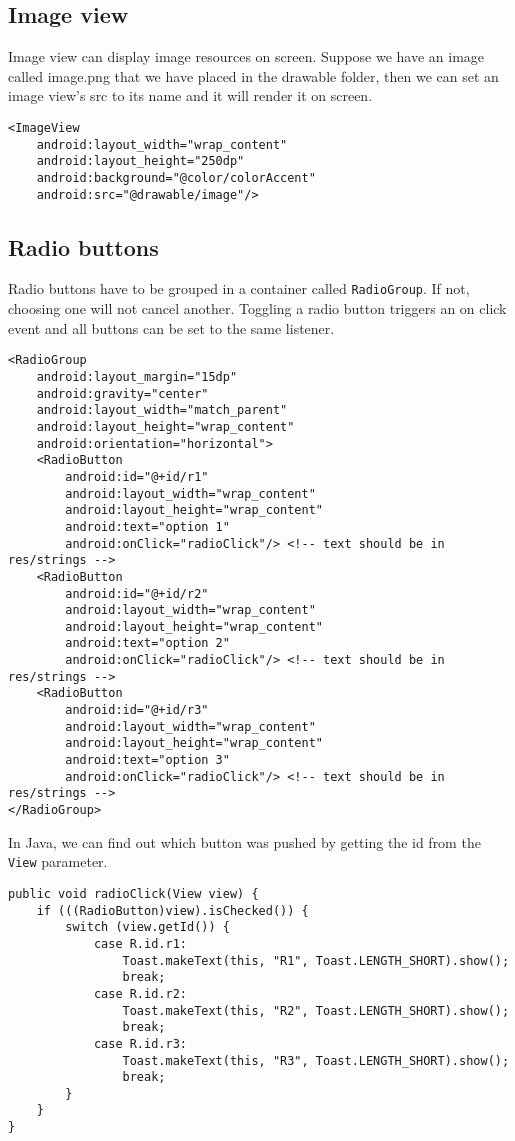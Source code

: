 \subsection{Image view}
Image view can display image resources on screen. Suppose we have an image called image.png that we have placed in the drawable folder, then we can set an image view's src to its name and it will render it on screen.
\begin{lstlisting}[style=A_XML, caption={Image view declaration}, label={listing:img}]
<ImageView
    android:layout_width="wrap_content"
    android:layout_height="250dp"
    android:background="@color/colorAccent"
    android:src="@drawable/image"/>
\end{lstlisting}

\subsection{Radio buttons}
Radio buttons have to be grouped in a container called \texttt{RadioGroup}. If not, choosing one will not cancel another. Toggling a radio button triggers an on click event and all buttons can be set to the same listener.
\begin{lstlisting}[style=A_XML, caption={Radio button declaration}, label={listing:radiodecl}]
<RadioGroup
    android:layout_margin="15dp"
    android:gravity="center"
    android:layout_width="match_parent"
    android:layout_height="wrap_content"
    android:orientation="horizontal">
    <RadioButton
        android:id="@+id/r1"
        android:layout_width="wrap_content"
        android:layout_height="wrap_content"
        android:text="option 1"
        android:onClick="radioClick"/> <!-- text should be in res/strings -->
    <RadioButton
        android:id="@+id/r2"
        android:layout_width="wrap_content"
        android:layout_height="wrap_content"
        android:text="option 2"
        android:onClick="radioClick"/> <!-- text should be in res/strings -->
    <RadioButton
        android:id="@+id/r3"
        android:layout_width="wrap_content"
        android:layout_height="wrap_content"
        android:text="option 3"
        android:onClick="radioClick"/> <!-- text should be in res/strings -->
</RadioGroup>
\end{lstlisting}

In Java, we can find out which button was pushed by getting the id from the \texttt{View} parameter. 

\begin{lstlisting}[style=A_Java, caption={Radio button event}, label={listing:radioev}]
public void radioClick(View view) {
    if (((RadioButton)view).isChecked()) {
        switch (view.getId()) {
            case R.id.r1:
                Toast.makeText(this, "R1", Toast.LENGTH_SHORT).show();
                break;
            case R.id.r2:
                Toast.makeText(this, "R2", Toast.LENGTH_SHORT).show();
                break;
            case R.id.r3:
                Toast.makeText(this, "R3", Toast.LENGTH_SHORT).show();
                break;
        }
    }
}
\end{lstlisting}

